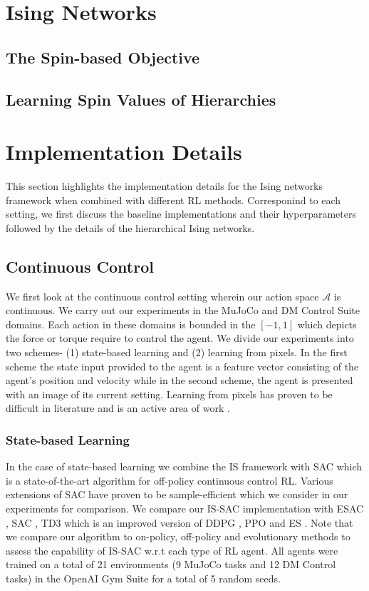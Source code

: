 \documentclass{article}
\begin{document}
\section{Ising Networks}

\subsection{The Spin-based Objective}

\subsection{Learning Spin Values of Hierarchies}

\section{Implementation Details}
This section highlights the implementation details for the Ising networks framework when combined with different RL methods. Corresponind to each setting, we first discuss the baseline implementations and their hyperparameters followed by the details of the hierarchical Ising networks. 

\subsection{Continuous Control}
We first look at the continuous control setting wherein our action space $\mathcal{A}$ is continuous. We carry out our experiments in the MuJoCo \cite{mujoco} and DM Control Suite \cite{dm} domains. Each action in these domains is bounded in the $[-1,1]$ which depicts the force or torque require to control the agent. We divide our experiments into two schemes- (1) state-based learning and (2) learning from pixels. In the first scheme the state input provided to the agent is a feature vector consisting of the agent's position and velocity while in the second scheme, the agent is presented with an image of its current setting. Learning from pixels has proven to be difficult in literature \cite{dm,dreamer} and is an active area of work \cite{rad,curl}.

\subsubsection{State-based Learning}
In the case of state-based learning we combine the IS framework with SAC \cite{sac} which is a state-of-the-art algorithm for off-policy continuous control RL. Various extensions of SAC have proven to be sample-efficient \cite{esac} which we consider in our experiments for comparison. We compare our IS-SAC implementation with ESAC \cite{esac}, SAC \cite{sac}, TD3 \cite{td3} which is an improved version of DDPG \cite{ddpg}, PPO \cite{ppo} and ES \cite{es}. Note that we compare our algorithm to on-policy, off-policy and evolutionary methods to assess the capability of IS-SAC w.r.t each type of RL agent. All agents were trained on a total of 21 environments (9 MuJoCo tasks and 12 DM Control tasks) in the OpenAI Gym Suite \cite{gym} for a total of 5 random seeds.
\end{document}
